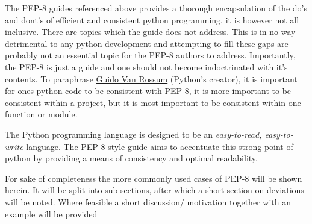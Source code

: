 \documentclass[a4paper,10pt,english]{sphinxmanual}
\begin{document}
The PEP-8 guides referenced above provides a thorough encapsulation of the do's and dont's of efficient and consistent python programming, it is however not all inclusive.
There are topics which the guide does not address. This is in no way detrimental to any python development and attempting to fill these gaps are probably not an essential topic for the PEP-8 authors to address.
Importantly, the PEP-8 is just a guide and one should not become indoctrinated with it's contents. To paraphrase \href{https://en.wikipedia.org/wiki/Guido\_van\_Rossum}{Guido Van Rossum} (Python's creator), it is important for ones python code
to be consistent with PEP-8, it is more important to be consistent within a project, but it is most important to be consistent within one function or module.

The Python programming language is designed to be an \emph{easy-to-read, easy-to-write} language. The PEP-8 style guide aims to accentuate this strong point of python by providing a means of consistency and optimal readability.

For sake of completeness the more commonly used cases of PEP-8 will be shown herein. It will be split into sub sections, after which a short section on  deviations will be noted. Where feasible
a short discussion/ motivation together with an example will be provided
\end{document}
